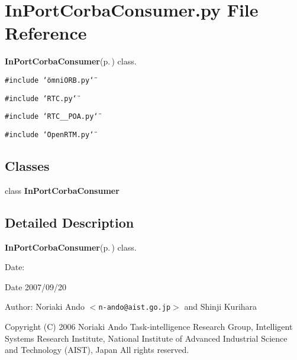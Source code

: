\section{In\-Port\-Corba\-Consumer.py File Reference}
\label{InPortCorbaConsumer_8py}
{\bf In\-Port\-Corba\-Consumer}{\rm (p.\,\pageref{classInPortCorbaConsumer})} class. 

{\tt \#include \char`\"{}omni\-ORB.py\char`\"{}}\par
{\tt \#include \char`\"{}RTC.py\char`\"{}}\par
{\tt \#include \char`\"{}RTC\_\-\_\-POA.py\char`\"{}}\par
{\tt \#include \char`\"{}Open\-RTM.py\char`\"{}}\par
\subsection*{Classes}
\begin{CompactItemize}
\item 
class {\bf In\-Port\-Corba\-Consumer}
\end{CompactItemize}


\subsection{Detailed Description}
{\bf In\-Port\-Corba\-Consumer}{\rm (p.\,\pageref{classInPortCorbaConsumer})} class. 

\begin{Desc}
\item[Date:]\begin{Desc}
\item[Date]2007/09/20 \end{Desc}
\end{Desc}
\begin{Desc}
\item[Author:]Noriaki Ando $<${\tt n-ando@aist.go.jp}$>$ and Shinji Kurihara\end{Desc}
Copyright (C) 2006 Noriaki Ando Task-intelligence Research Group, Intelligent Systems Research Institute, National Institute of Advanced Industrial Science and Technology (AIST), Japan All rights reserved.